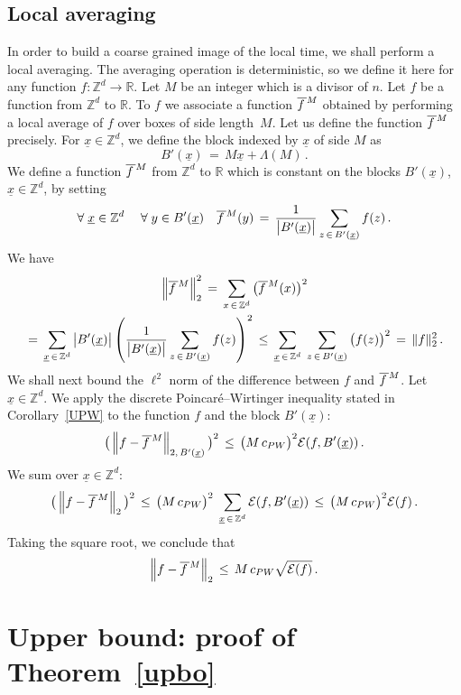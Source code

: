 \documentclass[AHL, Unicode, longabstracts, published]{cedram}
\newcommand{\xx}{{\underline{x}}}
\newcommand*\fm{\overline{f\,}^{\lower2pt\hbox{$\scriptstyle M$}}}
\newcommand*\Z {{\mathbb Z}}
\newcommand*\Zd {{\mathbb Z^d}}
\newcommand*\R{\mathbb{R}}
\newcommand*\La {{\Lambda}}
\newcommand{\cE}{\mathcal{E}}
\let\oldforall\forall
\renewcommand*{\forall}{\mathrel{\oldforall}}
\begin{document}
\subsection{Local averaging}\label{loca}
In order to build a coarse grained image of the local time, we shall perform a local averaging. The averaging operation is deterministic, so we define it here for any function $f:\Zd\to\R$. Let $M$ be an integer which is a divisor of $n$. Let $f$ be a function from $\Zd$ to $\R$. To $f$ we associate a function $\fm$ obtained by performing a local average of $f$ over boxes of side length~$M$. Let us define the function $\fm$ precisely. For $\xx\in \Zd$, we define the block indexed by $\xx$ of side $M$ as
\[
B'(\xx)\, =\, M\xx+\La(M)\,.
\]
We define a function $\fm$ from $\Z^d$ to $\R$ which is constant on the blocks $B'(\xx)$, $\xx\in\Zd$, by setting
\[
\forall \xx\in\Zd\quad\forall y\in
B'(\xx)\quad
\fm(y)\,=\,\frac{1}{\big|B'(\xx)\big|}\sum_{z\,\in\,B'(\xx)}f(z)\,.
\]
We have
\begin{multline}\label{normctl}
\left\|\fm\right\|_2^2\,=\,\sum_{x\,\in\,\Zd}\big(\fm(x)\big)^2\\
\,=\,\sum_{\xx\,\in\,\Zd}
\big|B'(\xx)\big|\left(
\frac{1}{\big|B'(\xx)\big|}\sum_{z\,\in\, B'(\xx)}f(z)\right)^2
\,\leq\,
\sum_{\xx\,\in\,\Zd}\;
\sum_{z\,\in\,B'(\xx)}\big(f(z)\big)^2
\,=\,\|f\|_2^2
\,.
\end{multline}
We shall next bound the $\ell^2$ norm of the difference between $f$ and $\fm$. Let $\xx\in \Zd$. We apply the discrete Poincaré--Wirtinger inequality stated in Corollary~\ref{UPW} to the function $f$ and the block $B'(\xx)$:
\[
\big(\left\|f-\fm\right\|_{2,\,B'(\xx)}\big)^2
\,\leq\,\big(M\,c_{PW}\big)^2
{\cE(f,B'(\xx))}\,.
\]
We sum over $\xx\in\Zd$:
\[
\big(\left\|f-\fm\right\|_{2}\big)^2
\,\leq\,\big(M\,c_{PW}\big)^2\;
\sum_{\xx\,\in\,\Zd}{\cE(f,B'(\xx))}
\,\leq\,\big(M\,c_{PW}\big)^2
{\cE(f)}\,.
\]
Taking the square root, we conclude that
\begin{equation}\label{difa}
\left\|f-\fm\right\|_{2}
\,\leq\,M\,c_{PW}
\sqrt{\cE(f)}\,.
\end{equation}
\section{Upper bound: proof of Theorem~\ref{upbo}}\label{S:proof_upbo}
\label{star}
\end{document}
